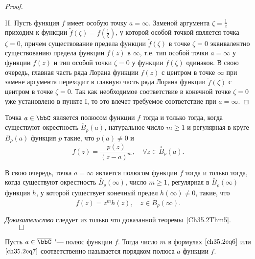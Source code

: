 \begin{proof}
\begin{enumerate}[wide, labelwidth=!, labelindent=\parindent]
\end{enumerate}

II. Пусть функция $f$ имеет особую точку $a = \infty$. Заменой аргумента $\zeta = \frac{1}{z}$ приходим к функции $\widetilde{f}(\zeta) = f(\frac{1}{\zeta})$, у которой особой точкой является точка $\zeta = 0$, причем существование предела функции $\widetilde{f}(\zeta)$ в точке $\zeta = 0$ эквивалентно существованию предела функции $f(z)$ в $\infty$, т.е. тип особой точки $a = \infty$ у функции $f(z)$ и тип особой точки $\zeta = 0$ у функции $\widetilde{f}(\zeta)$ одинаков. В свою очередь, главная часть ряда Лорана функции $f(z)$ с центром в точке $\infty$ при замене аргумента переходит в главную часть ряда Лорана функции $\widetilde{f}(\zeta)$ с центром в точке $\zeta = 0$. Так как необходимое соответствие в конечной точке $\zeta = 0$ уже установлено в пункте I, то это влечет требуемое соответствие при $a  =\infty$. 
\end{proof}

\begin{cons} \label{ch35.2cons1}
Точка $a \in \bbC$ является полюсом функции $f$ тогда и только тогда, когда существуют окрестность $\overset{\circ}{B}_\rho(a)$, натуральное число $m \ge 1$ и регулярная в круге $B_\rho(a)$ функция $p$ такие, что $p(a) \not = 0$ и
\begin{equation} \label{ch35.2eq6}
f(z) = \frac{p(z)}{(z - a)^m}, \quad \forall z \in \overset{\circ}{B}_\rho(a).
\end{equation}

В свою очередь, точка $a = \infty$ является полюсом функции $f$ тогда и только тогда, когда существуют окрестность $\overset{\circ}{B}_\rho(\infty)$, число $m \ge 1$, регулярная в $\overset{\circ}{B}_\rho(\infty)$ функция $h$, у которой существует конечный предел $h(\infty) \not= 0$, такие, что
\begin{equation} \label{ch35.2eq7}
f(z) = z^m h(z), \quad z \in \overset{\circ}{B}_\rho(\infty).
\end{equation}

\end{cons}

\noindent\textit{Доказательство} следует из только что доказанной теоремы~\ref{Ch35.2Thm5}. $\hfill\qed$

\begin{defn}
Пусть $a \in \overline{\bbC}$ "--- полюс функции $f$. Тогда число $m$ в формулах $\eqref{ch35.2eq6}$ или $\eqref{ch35.2eq7}$ соответственно называется порядком полюса $a$ функции $f$.
\end{defn}

